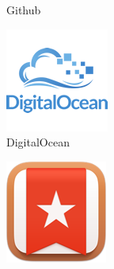 \begin{figure}[H]
\begin{subfigure}[t]{0.15\linewidth}
		\caption{Github}\label{fig:Github}
	\end{subfigure}
    \quad
	\begin{subfigure}[t]{0.15\linewidth}
		\centering
		\includegraphics[width=\linewidth]{Images/Generic/Icons/DigitalOcean}
		\caption{DigitalOcean}\label{fig:DigitalOcean}
	\end{subfigure}
    \quad
	\begin{subfigure}[t]{0.15\linewidth}
		\centering
		\includegraphics[width=\linewidth]{Images/Generic/Icons/Wunderlist}

\end{subfigure}
\end{figure}
